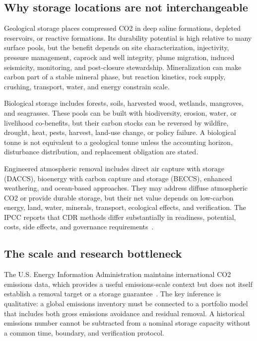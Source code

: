 \documentclass[conference]{IEEEtran}
\begin{document}
\subsection{Why storage locations are not interchangeable}
Geological storage places compressed CO2 in deep saline formations, depleted reservoirs, or reactive formations. Its durability potential is high relative to many surface pools, but the benefit depends on site characterization, injectivity, pressure management, caprock and well integrity, plume migration, induced seismicity, monitoring, and post-closure stewardship. Mineralization can make carbon part of a stable mineral phase, but reaction kinetics, rock supply, crushing, transport, water, and energy constrain scale.

Biological storage includes forests, soils, harvested wood, wetlands, mangroves, and seagrasses. These pools can be built with biodiversity, erosion, water, or livelihood co-benefits, but their carbon stocks can be reversed by wildfire, drought, heat, pests, harvest, land-use change, or policy failure. A biological tonne is not equivalent to a geological tonne unless the accounting horizon, disturbance distribution, and replacement obligation are stated.

Engineered atmospheric removal includes direct air capture with storage (DACCS), bioenergy with carbon capture and storage (BECCS), enhanced weathering, and ocean-based approaches. They may address diffuse atmospheric CO2 or provide durable storage, but their net value depends on low-carbon energy, land, water, minerals, transport, ecological effects, and verification. The IPCC reports that CDR methods differ substantially in readiness, potential, costs, side effects, and governance requirements~\cite{ipccwg3}.

\subsection{The scale and research bottleneck}
The U.S. Energy Information Administration maintains international CO2 emissions data, which provides a useful emissions-scale context but does not itself establish a removal target or a storage guarantee~\cite{eia}. The key inference is qualitative: a global emissions inventory must be connected to a portfolio model that includes both gross emissions avoidance and residual removal. A historical emissions number cannot be subtracted from a nominal storage capacity without a common time, boundary, and verification protocol.
\end{document}
